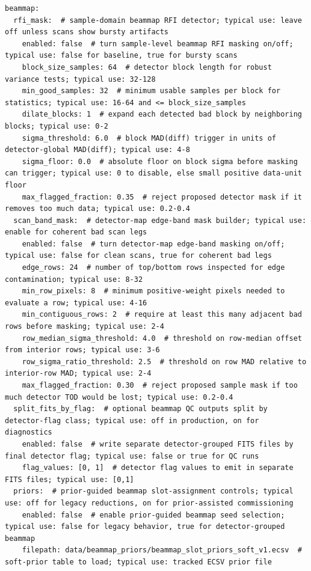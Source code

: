 \documentclass[11pt]{article}
\begin{document}
\begin{lstlisting}[language={}]
beammap:
  rfi_mask:  # sample-domain beammap RFI detector; typical use: leave off unless scans show bursty artifacts
    enabled: false  # turn sample-level beammap RFI masking on/off; typical use: false for baseline, true for bursty scans
    block_size_samples: 64  # detector block length for robust variance tests; typical use: 32-128
    min_good_samples: 32  # minimum usable samples per block for statistics; typical use: 16-64 and <= block_size_samples
    dilate_blocks: 1  # expand each detected bad block by neighboring blocks; typical use: 0-2
    sigma_threshold: 6.0  # block MAD(diff) trigger in units of detector-global MAD(diff); typical use: 4-8
    sigma_floor: 0.0  # absolute floor on block sigma before masking can trigger; typical use: 0 to disable, else small positive data-unit floor
    max_flagged_fraction: 0.35  # reject proposed detector mask if it removes too much data; typical use: 0.2-0.4
  scan_band_mask:  # detector-map edge-band mask builder; typical use: enable for coherent bad scan legs
    enabled: false  # turn detector-map edge-band masking on/off; typical use: false for clean scans, true for coherent bad legs
    edge_rows: 24  # number of top/bottom rows inspected for edge contamination; typical use: 8-32
    min_row_pixels: 8  # minimum positive-weight pixels needed to evaluate a row; typical use: 4-16
    min_contiguous_rows: 2  # require at least this many adjacent bad rows before masking; typical use: 2-4
    row_median_sigma_threshold: 4.0  # threshold on row-median offset from interior rows; typical use: 3-6
    row_sigma_ratio_threshold: 2.5  # threshold on row MAD relative to interior-row MAD; typical use: 2-4
    max_flagged_fraction: 0.30  # reject proposed sample mask if too much detector TOD would be lost; typical use: 0.2-0.4
  split_fits_by_flag:  # optional beammap QC outputs split by detector-flag class; typical use: off in production, on for diagnostics
    enabled: false  # write separate detector-grouped FITS files by final detector flag; typical use: false or true for QC runs
    flag_values: [0, 1]  # detector flag values to emit in separate FITS files; typical use: [0,1]
  priors:  # prior-guided beammap slot-assignment controls; typical use: off for legacy reductions, on for prior-assisted commissioning
    enabled: false  # enable prior-guided beammap seed selection; typical use: false for legacy behavior, true for detector-grouped beammap
    filepath: data/beammap_priors/beammap_slot_priors_soft_v1.ecsv  # soft-prior table to load; typical use: tracked ECSV prior file

\end{lstlisting}
\end{document}
